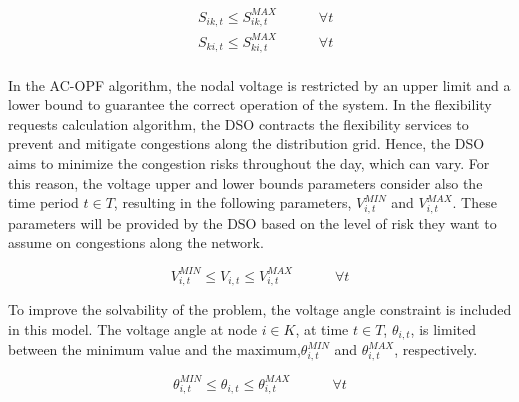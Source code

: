 \begin{subequations}
\begin{align*}
&  S_{ik,t} \leq S_{ik,t}^{MAX}  \quad   \qquad  \forall t  \\
&  S_{ki,t} \leq S_{ki,t}^{MAX}  \quad   \qquad  \forall t  \\ 
\end{align*}
\end{subequations}

In the AC-OPF algorithm, the nodal voltage is restricted by an upper limit and a lower bound to guarantee the correct operation of the system. In the flexibility requests calculation algorithm, the DSO contracts the flexibility services to prevent and mitigate congestions along the distribution grid. Hence, the DSO aims to minimize the congestion risks throughout the day, which can vary. For this reason, the voltage upper and lower bounds parameters consider also the time period $t \in T$, resulting in the following parameters, $V_{i,t}^{MIN}$ and $V_{i,t}^{MAX}$. These parameters will be provided by the DSO based on the level of risk they want to assume on congestions along the network.

\begin{equation*}
V_{i,t}^{MIN} \leq V_{i,t} \leq V_{i,t}^{MAX}  \quad   \qquad  \forall t 
\end{equation*}

To improve the solvability of the problem, the voltage angle constraint is included in this model. The voltage angle at node $i \in K$, at time $t \in T$, $\theta_{i,t}$, is limited between the minimum value and the maximum,$\theta_{i,t}^{MIN}$ and $\theta_{i,t}^{MAX}$, respectively.

\begin{equation*}
 \theta_{i,t}^{MIN} \leq \theta_{i,t}  \leq \theta_{i,t}^{MAX} \quad   \qquad  \forall t 
\end{equation*}


